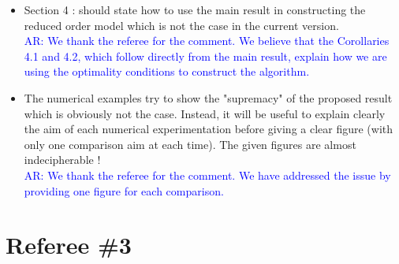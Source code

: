 \documentclass[11pt]{article}
\def\serkan#1{\textcolor{blue}{{#1}}}
\begin{document}
\begin{itemize}
\item Section 4 : should state how to use the main result in constructing
the reduced order model which is not the case in the current version.\\
\serkan{\textsf{AR}:  We thank the referee for the comment. We believe that the Corollaries 4.1 and 4.2, which follow directly from the main result, explain how we are using the optimality conditions to construct the algorithm.}

\item The numerical examples try to show the "supremacy" of the proposed
result which is obviously not the case. Instead, it will be useful to
explain clearly the aim of each numerical experimentation before giving
a clear figure (with only one comparison aim at each time). The given
figures are almost indecipherable !\\

\serkan{\textsf{AR}:  We thank the referee for the comment. We have addressed the issue by providing one figure for each comparison.}

\end{itemize}

\section*{Referee \#3}
\end{document}
